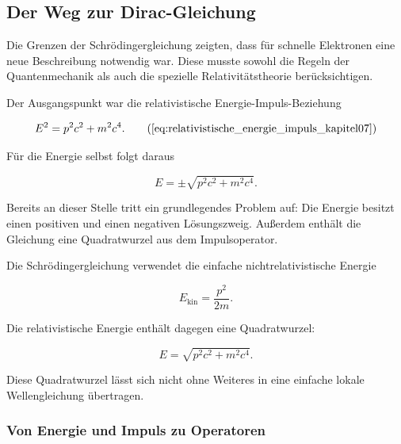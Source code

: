 
\subsection{Der Weg zur Dirac-Gleichung}
\label{subsec:weg_zur_diracgleichung}

Die Grenzen der Schrödingergleichung zeigten, dass für schnelle
Elektronen eine neue Beschreibung notwendig war. Diese musste sowohl
die Regeln der Quantenmechanik als auch die spezielle
Relativitätstheorie berücksichtigen.

Der Ausgangspunkt war die relativistische Energie-Impuls-Beziehung%

\begin{equation}
	E^2
	=
	p^2c^2
	+
	m^2c^4.
	\tag{\ref{eq:relativistische_energie_impuls_kapitel07}}
\end{equation}

Für die Energie selbst folgt daraus

\begin{equation}
	E
	=
	\pm
	\sqrt{
		p^2c^2
		+
		m^2c^4
	}.
	\label{eq:relativistische_energie_quadratwurzel}
\end{equation}

Bereits an dieser Stelle tritt ein grundlegendes Problem auf: Die
Energie besitzt einen positiven und einen negativen Lösungszweig.
Außerdem enthält die Gleichung eine Quadratwurzel aus dem
Impulsoperator.

\begin{DidacticBox}
	\label{box:zentrales_problem_weg_dirac}
	
	Die Schrödingergleichung verwendet die einfache nichtrelativistische
	Energie
	
	\begin{equation}
		E_{\mathrm{kin}}
		=
		\frac{p^2}{2m}.
	\end{equation}
	
	Die relativistische Energie enthält dagegen eine Quadratwurzel:
	
	\begin{equation}
		E
		=
		\sqrt{
			p^2c^2
			+
			m^2c^4
		}.
	\end{equation}
	
	Diese Quadratwurzel lässt sich nicht ohne Weiteres in eine einfache
	lokale Wellengleichung übertragen.
\end{DidacticBox}

\subsubsection*{Von Energie und Impuls zu Operatoren}

